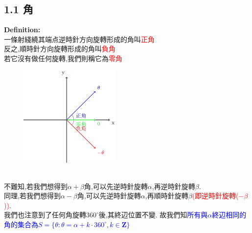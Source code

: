 \documentclass[11pt]{article}
\begin{document}
\subsection*{\LARGE 1.1 角}{
    \large \textbf{Definition:}\\
    一條射綫繞其端点逆時針方向旋轉形成的角叫\textcolor{red}{正角}\\
    反之,順時針方向旋轉形成的角叫\textcolor{red}{負角}\\
    若它沒有做任何旋轉,我們則稱它為\textcolor{red}{零角}\\
    \begin{figure}[h]
    \centering
    \includegraphics[width=5cm]{images/pos-neg-an.png}\\
    \caption{}
    \label{fig:enter-label}
    \end{figure}
}\\
不難知,若我們想得到$\alpha+\beta$角,可以先逆時針旋轉$\alpha$,再逆時針旋轉$\beta$.\\
同理,若我們想得到$\alpha-\beta$角,可以先逆時針旋轉$\alpha$,再順時針旋轉$\beta$\textcolor{red}{(即逆時針旋轉($-\beta$))}.\\

我們也注意到了任何角旋轉$360^{\circ}$後,其終辺位置不變.
故我們知\textcolor{blue}{所有與$\alpha$終辺相同的角的集合為$S=\{\theta:\theta=\alpha+k\cdot360^{\circ},k\in \mathbf{Z}\}$}
\end{document}
